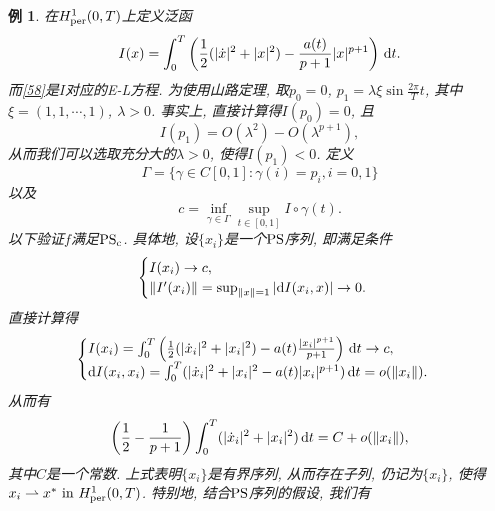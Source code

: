 \documentclass[12pt,a4paper]{article}
\newtheorem{example}[theorem]{例}
\begin{document}
\begin{example}
    在$H_{{\rm per}}^1(0, T)$上定义泛函 
    \begin{equation*}
        I(x) = \int_0^T\left(\frac{1}{2}(|\dot x|^2 + |x|^2) - \frac{a(t)}{p + 1}|x|^{p + 1}\right) \,{\rm d}t.
    \end{equation*}
    而\eqref{58}是$I$对应的E-L方程. 为使用山路定理, 取$p_0 = 0$, $p_1 = \lambda\xi\sin\frac{2\pi}{T}t$, 其中$\xi = (1, 1, \cdots, 1)$, $\lambda > 0$.
    事实上, 直接计算得$I(p_0) = 0$, 且 
    \begin{equation*}
        I(p_1) = O(\lambda^2) - O(\lambda^{p + 1}),
    \end{equation*}
    从而我们可以选取充分大的$\lambda > 0$, 使得$I(p_1) < 0$. 定义 
    \begin{equation*}
        \Gamma = \{\gamma \in C[0, 1]\colon \gamma(i) = p_i, i = 0, 1\}
    \end{equation*}
    以及 
    \begin{equation*}
        c = \inf_{\gamma \in \Gamma}\sup_{t \in [0, 1]}I \circ \gamma(t).
    \end{equation*}
    以下验证$f$满足${\rm PS_c}$. 具体地, 设$\{x_i\}$是一个${\rm PS}$序列, 即满足条件 
    \begin{equation*}
        \begin{cases}
            I(x_i) \rightarrow c, \\ 
            \Vert I'(x_i)\Vert = \sup_{\Vert x \Vert = 1}|{\rm d}I(x_i, x)| \rightarrow 0.
        \end{cases}
    \end{equation*}
    直接计算得 
    \begin{equation*}
        \begin{cases}
            I(x_i) = \int_0^T\left(\frac{1}{2}(|\dot x_i|^2 + |x_i|^2) - a(t)\frac{|x_i|^{p + 1}}{p + 1}\right) \,{\rm d}t \rightarrow c, \\
            {\rm d}I(x_i, x_i) = \int_0^T(|\dot x_i|^2 + |x_i|^2 - a(t)|x_i|^{p + 1}) \,{\rm d}t = o(\Vert x_i\Vert).
        \end{cases}
    \end{equation*}
    从而有
    \begin{equation*}
        \left(\frac{1}{2} - \frac{1}{p + 1}\right)\int_0^T(|\dot x_i|^2 + |x_i|^2) \,{\rm d}t = C + o(\Vert x_i \Vert),
    \end{equation*}
    其中$C$是一个常数. 上式表明$\{x_i\}$是有界序列, 从而存在子列, 仍记为$\{x_i\}$, 使得$x_i \rightharpoonup x^*\ {\rm in}\ H_{{\rm per}}^1(0, T)$.
    特别地, 结合${\rm PS}$序列的假设, 我们有 

\end{example}
\end{document}
